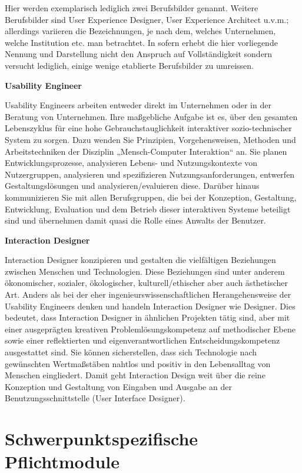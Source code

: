 Hier werden exemplarisch lediglich zwei Berufsbilder genannt. Weitere
Berufsbilder sind User Experience Designer, User Experience Architect
u.v.m.; allerdings variieren die Bezeichnungen, je nach dem, welches
Unternehmen, welche Institution etc. man betrachtet. In sofern erhebt
die hier vorliegende Nennung und Darstellung nicht den Anspruch auf
Vollständigkeit sondern versucht lediglich, einige wenige etablierte
Berufsbilder zu umreissen.

\textbf{Usability Engineer}

Usability Engineers arbeiten entweder direkt im Unternehmen oder in der
Beratung von Unternehmen. Ihre maßgebliche Aufgabe ist es, über den
gesamten Lebenszyklus für eine hohe Gebrauchstauglichkeit interaktiver
sozio-technischer System zu sorgen. Dazu wenden Sie Prinzipien,
Vorgehensweisen, Methoden und Arbeitstechniken der Disziplin
„Mensch-Computer Interaktion`` an. Sie planen Entwicklungsprozesse,
analysieren Lebens- und Nutzungskontexte von Nutzergruppen, analysieren
und spezifizieren Nutzungsanforderungen, entwerfen Gestaltungslösungen
und analysieren/evaluieren diese. Darüber hinaus kommunizieren Sie mit
allen Berufsgruppen, die bei der Konzeption, Gestaltung, Entwicklung,
Evaluation und dem Betrieb dieser interaktiven Systeme beteiligt sind
und übernehmen damit quasi die Rolle eines Anwalts der Benutzer.

\textbf{Interaction Designer}

Interaction Designer konzipieren und gestalten die vielfältigen
Beziehungen zwischen Menschen und Technologien. Diese Beziehungen sind
unter anderem ökonomischer, sozialer, ökologischer, kulturell/ethischer
aber auch ästhetischer Art. Anders als bei der eher
ingenieurswissenschaftlichen Herangehensweise der Usability Engineers
denken und handeln Interaction Designer wie Designer. Dies bedeutet,
dass Interaction Designer in ähnlichen Projekten tätig sind, aber mit
einer ausgeprägten kreativen Problemlösungskompetenz auf methodischer
Ebene sowie einer reflektierten und eigenverantwortlichen
Entscheidungskompetenz ausgestattet sind. Sie können sicherstellen, dass
sich Technologie nach gewünschten Wertmaßstäben nahtlos und positiv in
den Lebensalltag von Menschen eingliedert. Damit geht Interaction Design
weit über die reine Konzeption und Gestaltung von Eingaben und Ausgabe
an der Benutzungsschnittstelle (User Interface Designer).

\section*{Schwerpunktspezifische
Pflichtmodule}\label{schwerpunktspezifische-pflichtmodule}

